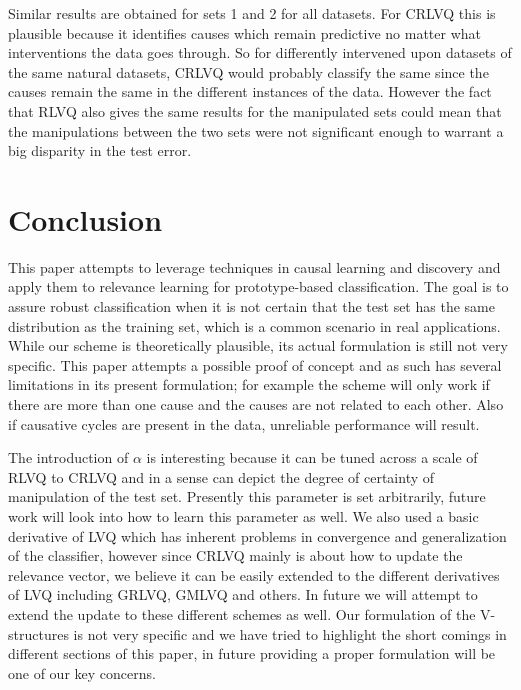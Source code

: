 \documentclass{esannV2}
\begin{document}
Similar results are obtained for sets 1 and 2 for all datasets. For CRLVQ this is plausible because it identifies causes which remain predictive no matter what interventions the data goes through. So for differently intervened upon datasets of the same natural datasets, CRLVQ would probably classify the same since the causes remain the same in the different instances of the data. However the fact that RLVQ also gives the same results for the manipulated sets could mean that the manipulations between the two sets were not significant enough to warrant a big disparity in the test error.

\section{Conclusion}
\label{sec:Conclusion}

This paper attempts to leverage techniques in causal learning and discovery and apply them to relevance learning for prototype-based classification. The goal is to assure robust classification when it is not certain that the test set has the same distribution as the training set, which is a common scenario in real applications. While our scheme is theoretically plausible, its actual formulation is still not very specific. This paper attempts a possible proof of concept and as such has several limitations in its present formulation; for example the scheme will only work if there are more than one cause and the causes are not related to each other. Also if causative cycles are present in the data, unreliable performance will result. 

The introduction of $\alpha$ is interesting because it can be tuned across a scale of RLVQ to CRLVQ and in a sense can depict the degree of certainty of manipulation of the test set. Presently this parameter is set arbitrarily, future work will look into how to learn this parameter as well. We also used a basic derivative of LVQ which has inherent problems in convergence and generalization of the classifier, however since CRLVQ mainly is about how to update the relevance vector, we believe it can be easily extended to the different derivatives of LVQ including GRLVQ, GMLVQ and others. In future we will attempt to extend the update to these different schemes as well. Our formulation of the V-structures is not very specific and we have tried to highlight the short comings in different sections of this paper, in future providing a proper formulation will be one of our key concerns.


\begin{footnotesize}




\end{footnotesize}

\end{document}
